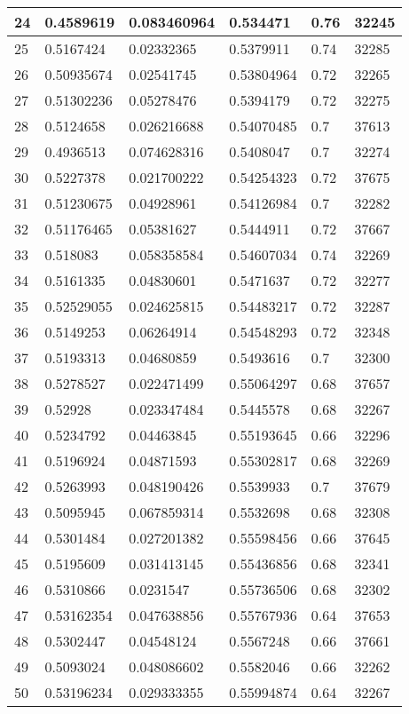 \begin{longtable}{|l|l|l|l|l|l|}
24 & 0.4589619 & 0.083460964 & 0.534471 & 0.76 & 32245 \\ \hline 
25 & 0.5167424 & 0.02332365 & 0.5379911 & 0.74 & 32285 \\ \hline 
26 & 0.50935674 & 0.02541745 & 0.53804964 & 0.72 & 32265 \\ \hline 
27 & 0.51302236 & 0.05278476 & 0.5394179 & 0.72 & 32275 \\ \hline 
28 & 0.5124658 & 0.026216688 & 0.54070485 & 0.7 & 37613 \\ \hline 
29 & 0.4936513 & 0.074628316 & 0.5408047 & 0.7 & 32274 \\ \hline 
30 & 0.5227378 & 0.021700222 & 0.54254323 & 0.72 & 37675 \\ \hline 
31 & 0.51230675 & 0.04928961 & 0.54126984 & 0.7 & 32282 \\ \hline 
32 & 0.51176465 & 0.05381627 & 0.5444911 & 0.72 & 37667 \\ \hline 
33 & 0.518083 & 0.058358584 & 0.54607034 & 0.74 & 32269 \\ \hline 
34 & 0.5161335 & 0.04830601 & 0.5471637 & 0.72 & 32277 \\ \hline 
35 & 0.52529055 & 0.024625815 & 0.54483217 & 0.72 & 32287 \\ \hline 
36 & 0.5149253 & 0.06264914 & 0.54548293 & 0.72 & 32348 \\ \hline 
37 & 0.5193313 & 0.04680859 & 0.5493616 & 0.7 & 32300 \\ \hline 
38 & 0.5278527 & 0.022471499 & 0.55064297 & 0.68 & 37657 \\ \hline 
39 & 0.52928 & 0.023347484 & 0.5445578 & 0.68 & 32267 \\ \hline 
40 & 0.5234792 & 0.04463845 & 0.55193645 & 0.66 & 32296 \\ \hline 
41 & 0.5196924 & 0.04871593 & 0.55302817 & 0.68 & 32269 \\ \hline 
42 & 0.5263993 & 0.048190426 & 0.5539933 & 0.7 & 37679 \\ \hline 
43 & 0.5095945 & 0.067859314 & 0.5532698 & 0.68 & 32308 \\ \hline 
44 & 0.5301484 & 0.027201382 & 0.55598456 & 0.66 & 37645 \\ \hline 
45 & 0.5195609 & 0.031413145 & 0.55436856 & 0.68 & 32341 \\ \hline 
46 & 0.5310866 & 0.0231547 & 0.55736506 & 0.68 & 32302 \\ \hline 
47 & 0.53162354 & 0.047638856 & 0.55767936 & 0.64 & 37653 \\ \hline 
48 & 0.5302447 & 0.04548124 & 0.5567248 & 0.66 & 37661 \\ \hline 
49 & 0.5093024 & 0.048086602 & 0.5582046 & 0.66 & 32262 \\ \hline 
50 & 0.53196234 & 0.029333355 & 0.55994874 & 0.64 & 32267 \\ \hline 
\end{longtable}